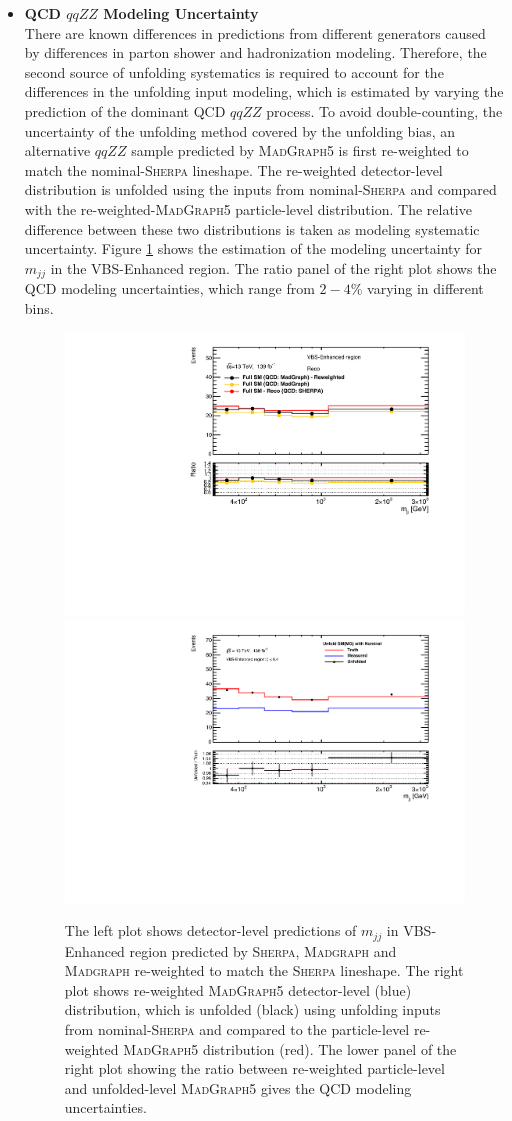 \begin{itemize}
{    }
    \newpage
    \item{\textbf{QCD $qqZZ$ Modeling Uncertainty}\\ There are known differences in predictions from different generators caused by differences in parton shower and hadronization modeling. Therefore, the second source of unfolding systematics is required to account for the differences in the unfolding input modeling, which is estimated by varying the prediction of the dominant QCD $qqZZ$ process. To avoid double-counting, the uncertainty of the unfolding method covered by the unfolding bias, an alternative $qqZZ$ sample predicted by \textsc{MadGraph5} is first re-weighted to match the nominal-\textsc{Sherpa} lineshape. The re-weighted detector-level distribution is unfolded using the inputs from nominal-\textsc{Sherpa} and compared with the re-weighted-\textsc{MadGraph5} particle-level distribution. The relative difference between these two distributions is taken as modeling systematic uncertainty. Figure \ref{fig:QCDModelUnc} shows the estimation of the modeling uncertainty for $m_{jj}$ in the VBS-Enhanced region. The ratio panel of the right plot shows the QCD modeling uncertainties, which range from $2-4\%$ varying in different bins.
    
    \begin{figure}[!htbp]
        \centering
        \includegraphics[width=.48\linewidth]{figures/Analysis/Systematics/QCDmodel_Dist.pdf}
        \includegraphics[width=.48\linewidth]{figures/Analysis/Systematics/QCDmodel_Unc.pdf}
        \caption{The left plot shows detector-level predictions of $m_{jj}$ in VBS-Enhanced region predicted by \textsc{Sherpa}, \textsc{Madgraph} and \textsc{Madgraph} re-weighted to match the \textsc{Sherpa} lineshape. The right plot shows re-weighted \textsc{MadGraph5} detector-level (blue) distribution, which is unfolded (black) using unfolding inputs from nominal-\textsc{Sherpa} and compared to the particle-level re-weighted \textsc{MadGraph5} distribution (red). The lower panel of the right plot showing the ratio between re-weighted particle-level and unfolded-level \textsc{MadGraph5} gives the QCD modeling uncertainties. \label{fig:QCDModelUnc}}
 \end{figure}  

    }
\end{itemize}


